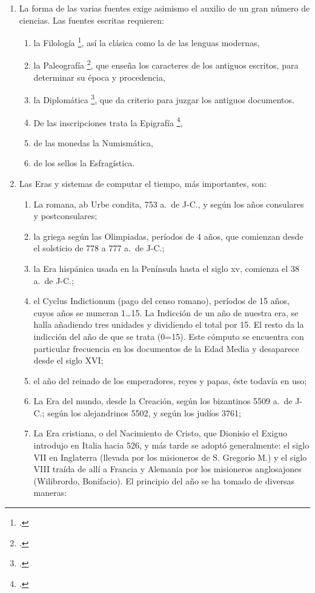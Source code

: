 \raggedbottom{} \documentclass[12pt, a4paper, openany]{book} %
\begin{document}
\begin{enumerate}
\begin{enumerate}
        \end{enumerate}
  \item La forma de las varias fuentes exige asimismo el auxilio de un gran número de ciencias. Las fuentes escritas requieren:\@ \begin{enumerate}
          \item la Filología \footcite{Stephanus1831Thesaurus}, así la clásica como la de las lenguas modernas,
          \item la Paleografía \footcite{Silvestre1839Paleographie}, que enseña los caracteres de los antiguos escritos, para determinar su época y procedencia,
          \item la Diplomática \footcite{Mabillon1681DeReDiplomatica}, que da criterio para juzgar los antiguos documentos.
          \item De las inscripciones trata la Epigrafía \footcite{Rossi1890Introductio},
          \item de las monedas la Numismática,
          \item de los sellos la Esfragística.
        \end{enumerate}
  \item Las Eras y sistemas de computar el tiempo, más importantes, son:\@ \begin{enumerate}
          \item La romana, ab Urbe condita, 753 a.\ de J-C., y según los años consulares y postconsulares;
          \item la griega según las Olimpiadas, períodos de 4 años, que comienzan desde el solsticio de 778 a 777 a.\ de J-C.;
          \item la Era hispánica usada en la Península hasta el siglo xv, comienza el 38 a.\ de J-C.;
          \item el Cyclus Indictionum (pago del censo romano), períodos de 15 años, cuyos años se numeran 1\ldots 15. La Indicción de un año de nuestra era, se halla añadiendo tres unidades y dividiendo el total por 15. El resto da la indicción del año de que se trata (0=15). Este cómputo se encuentra con particular frecuencia en los documentos de la Edad Media y desaparece desde el siglo XVI;\@
          \item el año del reinado de los emperadores, reyes y papas, éste todavía en uso;
          \item La Era del mundo, desde la Creación, según los bizantinos 5509 a.\ de J-C.; según los alejandrinos 5502, y según los judíos 3761;
          \item \label{Fecha_del_nacimiento_de_Cristo} La Era cristiana, o del Nacimiento de Cristo, que Dionisio el Exiguo introdujo en Italia hacia 526, y más tarde se adoptó generalmente: el siglo VII en Inglaterra (llevada por los misioneros de S. Gregorio M.) y el siglo VIII traída de allí a Francia y Alemania por los misioneros anglosajones (Wilibrordo, Bonifacio). El principio del año se ha tomado de diversas maneras: \begin{enumerate}

\end{enumerate}
\end{enumerate}
\end{enumerate}
\end{document}
